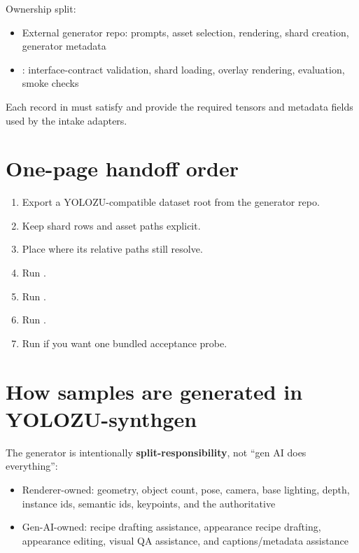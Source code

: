 Ownership split:
\begin{itemize}
  \item External generator repo: prompts, asset selection, rendering, shard creation, generator metadata
  \item \yolozu{}: interface-contract validation, shard loading, overlay rendering, evaluation, smoke checks
\end{itemize}

Each record in  must satisfy  and provide the required tensors and metadata fields used by the intake adapters.

\section{One-page handoff order}
\begin{enumerate}
  \item Export a YOLOZU-compatible dataset root from the generator repo.
  \item Keep shard rows and asset paths explicit.
  \item Place  where its relative paths still resolve.
  \item Run .
  \item Run .
  \item Run .
  \item Run  if you want one bundled acceptance probe.
\end{enumerate}

\section{How samples are generated in YOLOZU-synthgen}

The generator is intentionally \textbf{split-responsibility}, not ``gen AI does everything'':
\begin{itemize}
  \item Renderer-owned: geometry, object count, pose, camera, base lighting, depth, instance ids, semantic ids, keypoints, and the authoritative 
  \item Gen-AI-owned: recipe drafting assistance, appearance recipe drafting, appearance editing, visual QA assistance, and captions/metadata assistance
\end{itemize}

